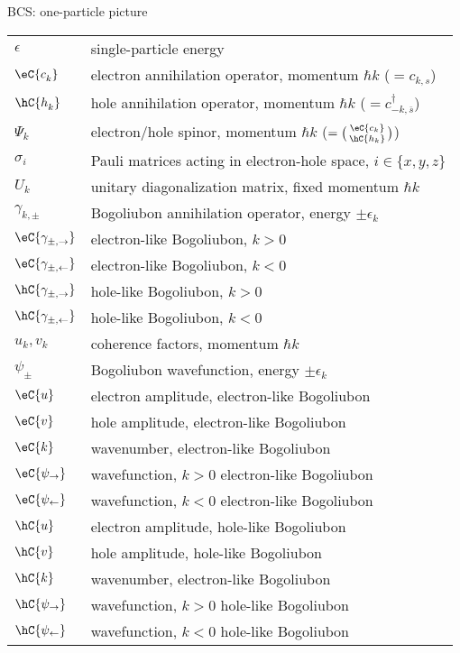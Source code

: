 {\Large\noindent BCS: one-particle picture}
\vspace{-.2cm}
\begin{longtable}{ m{5em} m{29em}}
$\epsilon$ & single-particle energy\\
$\eC{c_{k}^{}}$ & electron annihilation operator, momentum $\hbar k$ ($= c_{k,s}^{}$) \\
$\hC{h_{k}^{}}$ & hole annihilation operator, momentum $\hbar k$ ($= c_{-k,\overline{s}}^\dagger$) \\
$\Psi_k$ & electron/hole spinor, momentum $\hbar k$ ($= \big(\begin{smallmatrix}\eC{c_{k}} \\
\hC{h_{k}}\end{smallmatrix}\big)$) \\
$\sigma_i$ & Pauli matrices acting in electron-hole space, $i \in \{x, y, z\}$ \\
$U_k$ & unitary diagonalization matrix, fixed momentum $\hbar k$ \\
$\gamma_{k,\pm}^{}$ & Bogoliubon annihilation operator, energy $\pm \epsilon_k$ \\
$\eC{\gamma_{\pm, \rightarrow}^{}}$ & electron-like Bogoliubon, $k >0$ \\
$\eC{\gamma_{\pm, \leftarrow}^{}}$ & electron-like Bogoliubon, $k <0$ \\
$\hC{\gamma_{\pm, \rightarrow}^{}}$ & hole-like Bogoliubon, $k >0$ \\
$\hC{\gamma_{\pm, \leftarrow}^{}}$ & hole-like Bogoliubon, $k <0$ \\
$u_k,v_k$ & coherence factors, momentum $\hbar k$ \\
$\psi_\pm$ & Bogoliubon wavefunction, energy $\pm \epsilon_k$ \\
$\eC{u}$ & electron amplitude, electron-like Bogoliubon \\
$\eC{v}$ & hole amplitude, electron-like Bogoliubon \\
$\eC{k}$ & wavenumber, electron-like Bogoliubon \\
$\eC{\psi_\rightarrow}$ & wavefunction, $k >0$ electron-like Bogoliubon\\
$\eC{\psi_\leftarrow}$ & wavefunction, $k <0$ electron-like Bogoliubon\\
$\hC{u}$ & electron amplitude, hole-like Bogoliubon \\
$\hC{v}$ & hole amplitude, hole-like Bogoliubon \\
$\hC{k}$ & wavenumber, electron-like Bogoliubon \\
$\hC{\psi_\rightarrow}$ & wavefunction, $k >0$ hole-like Bogoliubon\\
$\hC{\psi_\leftarrow}$ & wavefunction, $k <0$ hole-like Bogoliubon\\
\end{longtable}
\vspace{.2cm}

